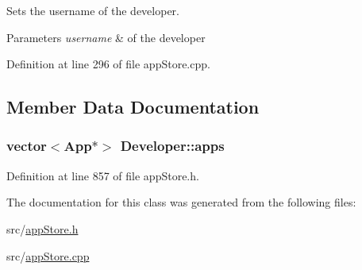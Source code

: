 Sets the username of the developer. 


\begin{DoxyParams}{Parameters}
{\em username} & of the developer \\
\hline
\end{DoxyParams}


Definition at line 296 of file app\-Store.\-cpp.



\subsection{Member Data Documentation}
\hypertarget{class_developer_a50e16f7d0661b4096420cf84f74609ff}{
\subsubsection[{apps}]{\setlength{\rightskip}{0pt plus 5cm}vector$<${\bf App}$\ast$$>$ Developer\-::apps}}\label{class_developer_a50e16f7d0661b4096420cf84f74609ff}


Definition at line 857 of file app\-Store.\-h.



The documentation for this class was generated from the following files\-:\begin{DoxyCompactItemize}
\item 
src/\hyperlink{app_store_8h}{app\-Store.\-h}\item 
src/\hyperlink{app_store_8cpp}{app\-Store.\-cpp}\end{DoxyCompactItemize}
